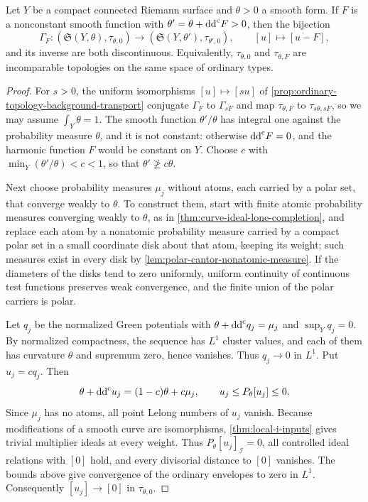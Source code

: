 \begin{proposition}\label{prop:ordinary-topology-gauge-failure}
Let $Y$ be a compact connected Riemann surface and $\theta>0$ a smooth form. If $F$ is a nonconstant smooth function with $\theta'=\theta+\mathrm{dd}^{\mathrm{c}} F>0$, then the bijection
\[
 \Gamma_F\colon(\mathfrak S(Y,\theta),\tau_{\theta,0})
 \longrightarrow(\mathfrak S(Y,\theta'),\tau_{\theta',0}),
 \qquad [u]\longmapsto[u-F],
\]
and its inverse are both discontinuous. Equivalently, $\tau_{\theta,0}$ and $\tau_{\theta,F}$ are incomparable topologies on the same space of ordinary types.
\end{proposition}
\begin{proof}
For $s>0$, the uniform isomorphisms $[u]\mapsto[su]$ of \cref{prop:ordinary-topology-background-transport} conjugate $\Gamma_F$ to $\Gamma_{sF}$ and map $\tau_{\theta,F}$ to $\tau_{s\theta,sF}$, so we may assume $\int_Y\theta=1$. The smooth function $\theta'/\theta$ has integral one against the probability measure $\theta$, and it is not constant: otherwise $\mathrm{dd}^{\mathrm{c}} F=0$, and the harmonic function $F$ would be constant on $Y$. Choose $c$ with $\min_Y(\theta'/\theta)<c<1$, so that $\theta'\not\geq c\theta$.

Next choose probability measures $\mu_j$ without atoms, each carried by a polar set, that converge weakly to $\theta$. To construct them, start with finite atomic probability measures converging weakly to $\theta$, as in \cref{thm:curve-ideal-lone-completion}, and replace each atom by a nonatomic probability measure carried by a compact polar set in a small coordinate disk about that atom, keeping its weight; such measures exist in every disk by \cref{lem:polar-cantor-nonatomic-measure}. If the diameters of the disks tend to zero uniformly, uniform continuity of continuous test functions preserves weak convergence, and the finite union of the polar carriers is polar.

Let $q_j$ be the normalized Green potentials with $\theta+\mathrm{dd}^{\mathrm{c}} q_j=\mu_j$ and $\sup_Yq_j=0$. By normalized compactness, the sequence has $L^1$ cluster values, and each of them has curvature $\theta$ and supremum zero, hence vanishes. Thus $q_j\to0$ in $L^1$. Put $u_j=cq_j$. Then
\[
 \theta+\mathrm{dd}^{\mathrm{c}} u_j=(1-c)\theta+c\mu_j,\qquad
 u_j\leq P_\theta[u_j]\leq0.
\]
Since $\mu_j$ has no atoms, all point Lelong numbers of $u_j$ vanish. Because modifications of a smooth curve are isomorphisms, \cref{thm:local-i-inputs} gives trivial multiplier ideals at every weight. Thus $P_\theta[u_j]_{\mathcal I}=0$, all controlled ideal relations with $[0]$ hold, and every divisorial distance to $[0]$ vanishes. The bounds above give convergence of the ordinary envelopes to zero in $L^1$. Consequently $[u_j]\to[0]$ in $\tau_{\theta,0}$.


\end{proof}
